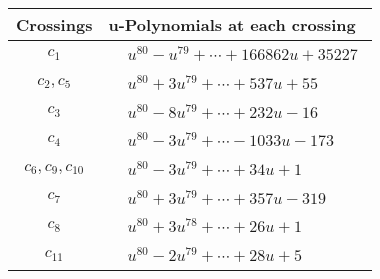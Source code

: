 \documentclass[1p]{elsarticle_modified}
\theoremstyle{definition}
\begin{document}
\begin{tabular}{m{50pt}|m{274pt}}
Crossings & \hspace{64pt}u-Polynomials at each crossing \\
\hline $$\begin{aligned}c_{1}\end{aligned}$$&$\begin{aligned}
&u^{80}- u^{79}+\cdots+166862 u+35227
\end{aligned}$\\
\hline $$\begin{aligned}c_{2},c_{5}\end{aligned}$$&$\begin{aligned}
&u^{80}+3 u^{79}+\cdots+537 u+55
\end{aligned}$\\
\hline $$\begin{aligned}c_{3}\end{aligned}$$&$\begin{aligned}
&u^{80}-8 u^{79}+\cdots+232 u-16
\end{aligned}$\\
\hline $$\begin{aligned}c_{4}\end{aligned}$$&$\begin{aligned}
&u^{80}-3 u^{79}+\cdots-1033 u-173
\end{aligned}$\\
\hline $$\begin{aligned}c_{6},c_{9},c_{10}\end{aligned}$$&$\begin{aligned}
&u^{80}-3 u^{79}+\cdots+34 u+1
\end{aligned}$\\
\hline $$\begin{aligned}c_{7}\end{aligned}$$&$\begin{aligned}
&u^{80}+3 u^{79}+\cdots+357 u-319
\end{aligned}$\\
\hline $$\begin{aligned}c_{8}\end{aligned}$$&$\begin{aligned}
&u^{80}+3 u^{78}+\cdots+26 u+1
\end{aligned}$\\
\hline $$\begin{aligned}c_{11}\end{aligned}$$&$\begin{aligned}
&u^{80}-2 u^{79}+\cdots+28 u+5
\end{aligned}$\\
\hline
\end{tabular}\\~\\
\end{document}
